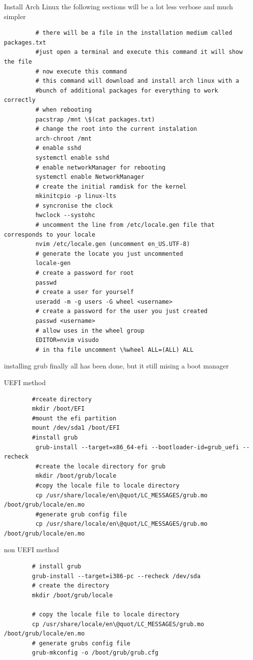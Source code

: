 \begin{section}{Install Arch Linux}
	 the following sections will be a lot less verbose and much simpler
	 \begin{verbatim}
		 # there will be a file in the installation medium called packages.txt 
		 #just open a terminal and execute this command it will show the file
		 # now execute this command
		 # this command will download and install arch linux with a
		 #bunch of additional packages for everything to work correctly
		 # when rebooting
		 pacstrap /mnt \$(cat packages.txt)
		 # change the root into the current instalation
		 arch-chroot /mnt
		 # enable sshd
		 systemctl enable sshd
		 # enable networkManager for rebooting
		 systemctl enable NetworkManager
		 # create the initial ramdisk for the kernel
		 mkinitcpio -p linux-lts
		 # syncronise the clock
		 hwclock --systohc
		 # uncomment the line from /etc/locale.gen file that corresponds to your locale
		 nvim /etc/locale.gen (uncomment en_US.UTF-8)
		 # generate the locate you just uncommented
		 locale-gen
		 # create a password for root
		 passwd
		 # create a user for yourself
		 useradd -m -g users -G wheel <username>
		 # create a password for the user you just created
		 passwd <username>
		 # allow uses in the wheel group
		 EDITOR=nvim visudo
		 # in tha file uncomment \%wheel ALL=(ALL) ALL
	 \end{verbatim}
\end{section}
\newpage
\begin{section}{installing grub}
	finally all has been done, 
	but it still mising a boot manager
	\begin{Large}
		UEFI method
	\end{Large}
	\begin{verbatim}
		#rceate directory
		mkdir /boot/EFI
		#mount the efi partition
		mount /dev/sda1 /boot/EFI
		#install grub
		 grub-install --target=x86_64-efi --bootloader-id=grub_uefi --recheck
		 #create the locale directory for grub
		 mkdir /boot/grub/locale
		 #copy the locale file to locale directory
		 cp /usr/share/locale/en\@quot/LC_MESSAGES/grub.mo /boot/grub/locale/en.mo
		 #generate grub config file
		 cp /usr/share/locale/en\@quot/LC_MESSAGES/grub.mo /boot/grub/locale/en.mo
	\end{verbatim}

	\begin{Large}
		non UEFI method
	\end{Large}
	\begin{verbatim}
		# install grub
		grub-install --target=i386-pc --recheck /dev/sda
		# create the directory 
		mkdir /boot/grub/locale

		# copy the locale file to locale directory
		cp /usr/share/locale/en\@quot/LC_MESSAGES/grub.mo /boot/grub/locale/en.mo
		# generate grubs config file
		grub-mkconfig -o /boot/grub/grub.cfg

	\end{verbatim}

\end{section}
